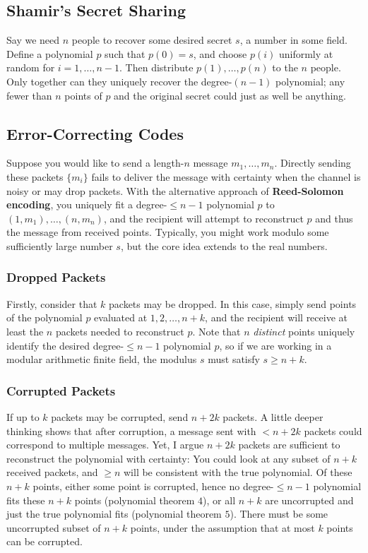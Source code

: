 \documentclass[12pt]{article}
\begin{document}
\subsection{Shamir's Secret Sharing}

Say we need $n$ people to recover some desired secret $s$, a number in some field. Define a polynomial $p$ such that $p(0) = s$, and choose $p(i)$ uniformly at random for $i = 1, \ldots, n - 1$. Then distribute $p(1), \ldots, p(n)$ to the $n$ people. Only together can they uniquely recover the degree-$(n - 1)$ polynomial; any fewer than $n$ points of $p$ and the original secret could just as well be anything.

\subsection{Error-Correcting Codes}

Suppose you would like to send a length-$n$ message $m_1, \ldots, m_n$. Directly sending these packets $\{ m_i \}$ fails to deliver the message with certainty when the channel is noisy or may drop packets. With the alternative approach of \textbf{Reed-Solomon encoding}, you uniquely fit a degree-$\leq n - 1$ polynomial $p$ to $(1, m_1), \ldots, (n, m_n)$, and the recipient will attempt to reconstruct $p$ and thus the message from received points. Typically, you might work modulo some sufficiently large number $s$, but the core idea extends to the real numbers.

\subsubsection{Dropped Packets}

Firstly, consider that $k$ packets may be dropped. In this case, simply send points of the polynomial $p$ evaluated at $1, 2, \ldots, n + k$, and the recipient will receive at least the $n$ packets needed to reconstruct $p$. Note that $n$ \emph{distinct} points uniquely identify the desired degree-$\leq n - 1$ polynomial $p$, so if we are working in a modular arithmetic finite field, the modulus $s$ must satisfy $s \geq n + k$.

\subsubsection{Corrupted Packets}

If up to $k$ packets may be corrupted, send $n + 2k$ packets. A little deeper thinking shows that after corruption, a message sent with $< n + 2k$ packets could correspond to multiple messages. Yet, I argue $n + 2k$ packets are sufficient to reconstruct the polynomial with certainty: You could look at any subset of $n + k$ received packets, and $\geq n$ will be consistent with the true polynomial. Of these $n + k$ points, either some point is corrupted, hence no degree-$\leq n - 1$ polynomial fits these $n + k$ points (polynomial theorem $4$), or all $n + k$ are uncorrupted and just the true polynomial fits (polynomial theorem $5$). There must be some uncorrupted subset of $n + k$ points, under the assumption that at most $k$ points can be corrupted.
\end{document}
